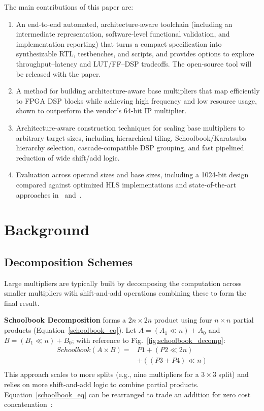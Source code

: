 \documentclass[sigconf,9pt,review]{acmart}
\begin{document}
The main contributions of this paper are: 
\begin{enumerate}
    \item An end-to-end automated, architecture-aware toolchain (including an intermediate representation, software-level functional validation, and implementation reporting) that turns a compact specification into synthesizable RTL, testbenches, and scripts, and provides options to explore throughput--latency and LUT/FF--DSP tradeoffs. The open-source tool will be released with the paper.
    \item A method for building architecture-aware base multipliers that map efficiently to FPGA DSP blocks while achieving high frequency and low resource usage, shown to outperform the vendor's 64-bit IP multiplier.
    \item Architecture-aware construction techniques for scaling base multipliers to arbitrary target sizes, including hierarchical tiling, Schoolbook/Karatsuba hierarchy selection, cascade-compatible DSP grouping, and fast pipelined reduction of wide shift/add logic.
    \item Evaluation across operand sizes and base sizes, including a 1024-bit design compared against optimized HLS implementations and state-of-the-art approaches in~\cite{zhangIMpressLargeInteger2022} and~\cite{kummTilingHeuristics2020}.

\end{enumerate}



\section{Background} \label{sec_background}
\subsection{Decomposition Schemes}
Large multipliers are typically built by decomposing the computation across smaller multipliers with shift-and-add operations combining these to form the final result.

\noindent\textbf{Schoolbook Decomposition} forms a $2n\times 2n$ product using four $n\times n$ partial products (Equation~\ref{schoolbook_eq}). Let $A=(A_1\ll n)+A_0$ and $B=(B_1\ll n)+B_0$; with reference to Fig.~\ref{fig:schoolbook_decomp}:
\begin{equation} \label{schoolbook_eq}
\begin{split}
    \mathit{Schoolbook}(A \times B) = & P1 + (P2 \ll 2n) \\
                &+ ((P3+ P4) \ll n) \\
\end{split}
\end{equation}
This approach scales to more splits (e.g., nine multipliers for a $3\times 3$ split) and relies on more shift-and-add logic to combine partial products.
Equation~\ref{schoolbook_eq} can be rearranged to trade an addition for zero cost concatenation~\cite{zhangIMpressLargeInteger2022}:
\end{document}
